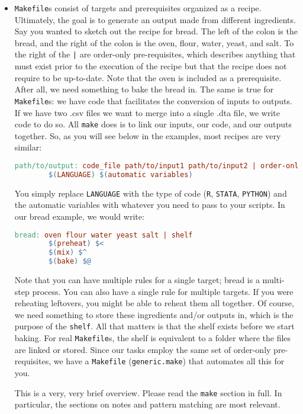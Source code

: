 \begin{itemize}
\item \texttt{Makefile}s consist of targets and prerequisites organized as a recipe. 
Ultimately, the goal is to generate an output made from different ingredients.
Say you wanted to sketch out the recipe for bread.
The left of the colon is the bread, 
and the right of the colon is the oven, flour, water, yeast, and salt.
To the right of the \texttt{|} are order-only pre-requisites, 
which describes anything that must exist prior to the execution of the recipe 
but that the recipe does not require to be up-to-date.
Note that the oven is included as a prerequisite. 
After all, we need something to bake the bread in.
The same is true for \texttt{Makefile}s: 
we have code that facilitates the conversion of inputs to outputs.
If we have two .csv files we want to merge into a single .dta file, 
we write code to do so. 
All \texttt{make} does is to link our inputs, our code, and our outputs together.
So, as you will see below in the examples, most recipes are very similar: 
\begin{lstlisting}[language=make]
    path/to/output: code_file path/to/input1 path/to/input2 | order-only pre-requisite
        $(LANGUAGE) $(automatic variables)
    \end{lstlisting}
You simply replace \texttt{LANGUAGE} with the type of code (\texttt{R}, 
\texttt{STATA}, \texttt{PYTHON}) and the automatic variables with whatever you need to pass to your scripts.
In our bread example, we would write:
\begin{lstlisting}[language=make]
    bread: oven flour water yeast salt | shelf
        $(preheat) $<
        $(mix) $^
        $(bake) $@
    \end{lstlisting}
Note that you can have multiple rules for a single target; 
bread is a multi-step process.
You can also have a single rule for multiple targets. 
If you were reheating leftovers, you might be able to reheat them all together. 
Of course, we need something to store these ingredients and/or outputs in, 
which is the purpose of the \texttt{shelf}.
All that matters is that the shelf exists before we start baking.
For real \texttt{Makefile}s, 
the shelf is equivalent to a folder where the files are linked or stored.
Since our tasks employ the same set of order-only pre-requisites, 
we have a \texttt{Makefile} (\texttt{generic.make}) that automates all this for you.

This is a very, very brief overview. Please read the \texttt{make} section in full.
In particular, the sections on notes and pattern matching are most relevant.


\end{itemize}

